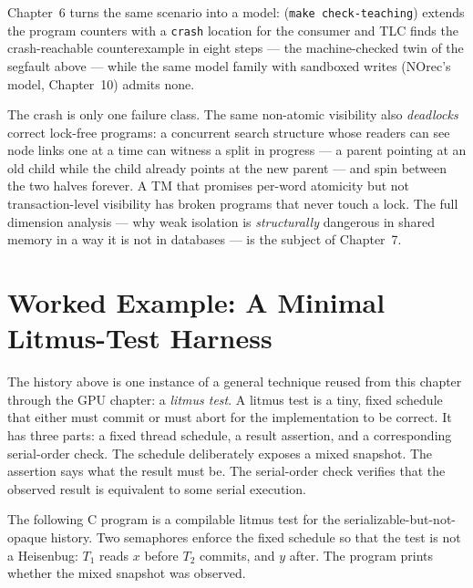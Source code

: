 Chapter~6 turns the same scenario into a model:
 (\texttt{make check-teaching}) extends the
program counters with a \texttt{crash} location for the consumer and TLC finds
the crash-reachable counterexample in eight steps --- the machine-checked twin
of the segfault above --- while the same model family with sandboxed writes
(NOrec's model, Chapter~10) admits none.

The crash is only one failure class. The same non-atomic visibility also
\emph{deadlocks} correct lock-free programs: a concurrent search structure
whose readers can see node links one at a time can witness a split in
progress --- a parent pointing at an old child while the child already points
at the new parent --- and spin between the two halves forever. A TM that
promises per-word atomicity but not transaction-level visibility has broken
programs that never touch a lock. The full dimension analysis --- why weak
isolation is \emph{structurally} dangerous in shared memory in a way it is not
in databases --- is the subject of Chapter~7.

\section{Worked Example: A Minimal Litmus-Test Harness}

The history above is one instance of a general technique reused from this
chapter through the GPU chapter: a \emph{litmus test}. A litmus test is a tiny,
fixed schedule that either must commit or must abort for the implementation to
be correct. It has three parts: a fixed thread schedule, a result assertion,
and a corresponding serial-order check. The schedule deliberately exposes a
mixed snapshot. The assertion says what the result must be. The serial-order
check verifies that the observed result is equivalent to some serial execution.

The following C program is a compilable litmus test for the
serializable-but-not-opaque history. Two semaphores enforce the fixed schedule
so that the test is not a Heisenbug: $T_1$ reads $x$ before $T_2$ commits,
and $y$ after. The program prints whether the mixed snapshot was observed.

